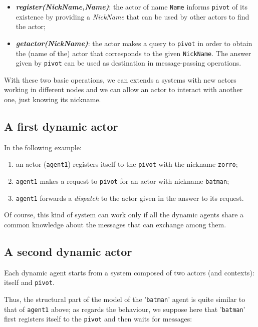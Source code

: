 \begin{itemize}
\item \textit{\textbf{register(NickName,Name)}}: the actor of name \texttt{Name} informs \texttt{pivot} of its existence by providing a \textit{NickName} that can be used by other actors to find the actor;
\item \textit{\textbf{getactor(NickName)}}: the actor makes a query to \texttt{pivot} in order to obtain the (name of the) actor that corresponds to the given \texttt{NickName}. The answer given by \texttt{pivot} can be used as destination in message-passing operations.
\end{itemize}

With these two basic operations, we can extends a systems with new actors working in different nodes and we can allow an actor to interact with another one, just knowing its nickname. 

\subsection{A first dynamic actor}
In the following example:

\begin{enumerate}
\item an actor (\texttt{agent1}) registers itself to the \texttt{pivot} with the nickname \texttt{zorro};
\item \texttt{agent1} makes a request to  \texttt{pivot} for an actor with nickname \texttt{batman};
\item  \texttt{agent1} forwards a \textit{dispatch} to the actor given in the answer to its request.
\end{enumerate}



Of course, this kind of system can work only if all the dynamic agents share a common knowledge about the messages that can exchange among them.

 
\subsection{A second dynamic actor}
Each dynamic agent starts from a system composed of two actors (and contexts): itself and \texttt{pivot}. 

Thus, the structural part of the model of the '\texttt{batman}' agent is quite similar to that of  \texttt{agent1} above; as regards the behaviour, we suppose here that '\texttt{batman}' first registers itself to the \texttt{pivot} and then waits for messages:

